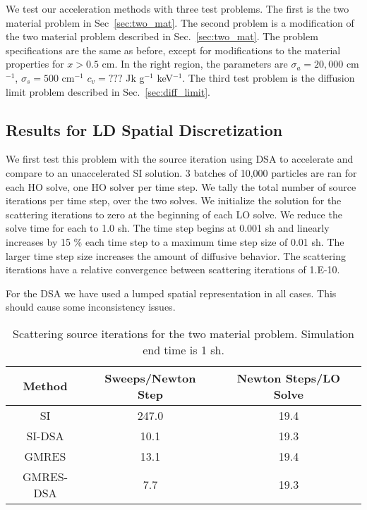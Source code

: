 {We test our acceleration methods with three test problems.  The first is the two material
problem in Sec~\ref{sec:two_mat}.  The second problem is a modification of the two material problem described in
Sec.~\ref{sec:two_mat}. The problem specifications are the same as before, except for
modifications to the material properties for $x>0.5$ cm.  In the right region, the
parameters are $\sigma_a = 20,000$ cm$^{-1}$, $\sigma_s=500 $ cm$^{-1}$ $c_v =??? $ Jk
g$^{-1}$ keV$^{-1}$.  The third test problem is the diffusion limit problem described in
Sec.~\ref{sec:diff_limit}.

\subsection{Results for LD Spatial Discretization}

We first test this problem with the source iteration using DSA to accelerate and compare
to an unaccelerated SI solution.  3 batches of 10,000 particles are ran for each HO
solve, one HO solver per time step.  We tally the total number of source iterations per
time step, over the two solves.  We initialize the solution for the scattering iterations to zero at the beginning of
each LO solve.  We reduce the solve time for each to 1.0 sh.  The time step begins at
0.001 sh and linearly increases by 15 \% each time step to a maximum time step size of
0.01 sh.  The larger time step size increases the amount of diffusive behavior.  The
scattering iterations have a relative convergence between scattering iterations of 1.E-10.

For the DSA we have used a lumped spatial representation in all cases.  This should cause
some inconsistency issues.


\begin{table}
    \caption{\label{tab:twomat_dsa_iters} Scattering source iterations for the two
material problem.  Simulation end time is 1 sh.}
    \begin{tabular}{ccc} \hline
        Method & Sweeps/Newton Step & Newton Steps/LO Solve \\ \hline
        SI     & 247.0 & 19.4                \\
        SI-DSA & 10.1   & 19.3      \\
        GMRES  & 13.1    &  19.4     \\
        GMRES-DSA & 7.7  &  19.3  \\ \hline
    \end{tabular}
\end{table}



}
